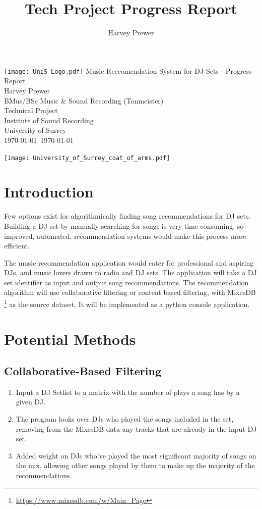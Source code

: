 \documentclass[11pt,titlepage,oneside]{book}
\title{Tech Project Progress Report}
\author{Harvey Prewer}
\newcommand{\LongTitle}{Music Reccomendation System for DJ Sets - Progress Report}
\newcommand{\Me}{Harvey Prewer}
\begin{document}
\begin{titlepage}

\thispagestyle{empty}
\hfill\texttt{[image: UniS\_Logo.pdf]}
{\sf
	\centering
	\null\vfil\vfil
	{
		\huge\LongTitle\\
	}
	\vfil\vfil\vfil
	{
		\Large\Me\\
	}
	\vfil\vfil\vfil
	{
		\Large{}BMus/BSc Music \& Sound Recording (Tonmeister)\\
		Technical Project\\
	}
	\vfil\vfil
	{
		\Large{}Institute of Sound Recording\\
		University of Surrey\\
	}
	\vfil
	{
		\Large\MyMonth\today~\MyYear\today\\}
}

{
	\texttt{[image: University\_of\_Surrey\_coat\_of\_arms.pdf]}
	\vspace{-.4in}
}

\end{titlepage}
\section{Introduction}
	 \begin{flushleft}
	 Few options exist for algorithmically finding song recommendations for DJ sets. Building a DJ set by manually searching for songs is very time consuming, so improved, automated, recommendation systems would make this process more efficient. 
	\end{flushleft}

\begin{flushleft}
	 The music recommendation application would cater for professional and aspiring DJs, and music lovers drawn to radio and DJ sets. The application will take a DJ set identifier as input and output song recommendations. The recommendation algorithm will use collaborative filtering or content based filtering, with MixesDB \footnote{\url{https://www.mixesdb.com/w/Main_Page}} as the source dataset. It will be implemented as a python console application.
	\end{flushleft}
\section{Potential Methods}
	 \subsection{Collaborative-Based Filtering}
	 \begin{enumerate}
	 	
	 	\item  Input a DJ Setlist to a matrix with the number of plays a song has by a given DJ.
	 	\item The program looks over DJs who played the songs included in the set, removing from the MixesDB data any tracks that are already in the input DJ set.
	 	\item Added weight on DJs who've played the most significant majority of songs on the mix, allowing other songs played by them to make up the majority of the recommendations.
	 \end{enumerate}
\end{document}
